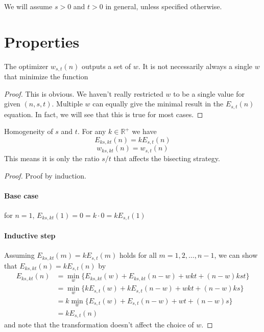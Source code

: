 \documentclass[]{article}
\begin{document}
We will assume $s > 0 $ and $t > 0$ in general, unless specified otherwise.

\section{Properties}
\vspace{1cm}
\begin{lemma}[$w$-set]
	The optimizer $w_{s,t}(n)$ outputs a set of $w$. It is not necessarily always a single $w$ that minimize the function
\end{lemma}
\begin{proof}
	This is obvious. We haven't really restricted $w$ to be a single value for given $(n,s,t)$. Multiple $w$ can equally give the minimal result in the $E_{s,t}(n)$ equation. In fact, we will see that this is true for most cases. 
\end{proof}	

\vspace{1cm}
\begin{lemma}[Homogeneity] Homogeneity of $s$ and $t$. For any $k\in\mathbb{R}^+$ we have
\[
	E_{ks,kt}(n) = k E_{s,t}(n)
\]
\[
	w_{ks,kt}(n) = w_{s,t}(n)
\]
This means it is only the ratio $s/t$ that affects the bisecting strategy.
\end{lemma}
\begin{proof}
		Proof by induction. 
	\paragraph{Base case} for $n = 1$, $E_{ks,kt}(1) = 0 = k\cdot0 = kE_{s,t}(1)$
	\paragraph{Inductive step} Assuming $E_{ks,kt}(m) = k E_{s,t}(m)$ holds for all $m = 1,2,\dots,n-1$, we can show that $E_{ks,kt}(n) = k E_{s,t}(n)$ by 
	\begin{align*}
	E_{ks,kt}(n) &= \min_{w}\{E_{ks,kt}(w) + E_{ks,kt}(n-w) + wkt +(n-w)kst\}\\
	  &= \min_{w}\{k E_{s,t}(w) + k E_{s,t}(n-w) + wkt +(n-w)ks\}\\
	  &= k\min_{w}\{E_{s,t}(w) + E_{s,t}(n-w) + wt +(n-w)s\}\\
	  &=kE_{s,t}(n)
	\end{align*}
	and note that the transformation doesn't affect the choice of $w$.
\end{proof}	
\end{document}
